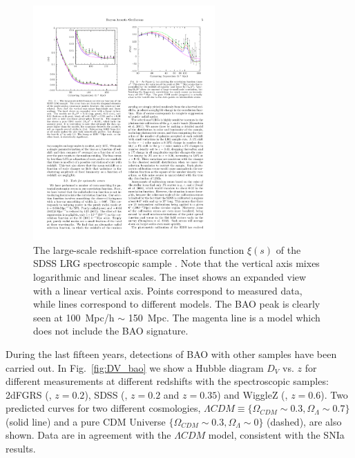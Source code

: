 \begin{figure}
\centering
\includegraphics[height=90mm]{./plots/bao_eisenstein.pdf} 
\caption{The large-scale redshift-space correlation function $\xi(s)$ of the SDSS LRG spectroscopic sample \citep{Eisenstein2005}. Note that the vertical axis mixes logarithmic and linear scales. The inset shows an expanded view with a linear vertical axis. Points correspond to measured data, while lines correspond to different models. The BAO peak is clearly seen at 100~Mpc/h $\sim$ 150~Mpc. The magenta line is a model which does not include the BAO signature.}
\label{fig:xi_bao}
\end{figure}
During the last fifteen years, detections of BAO with other samples have been carried out. In Fig.~\ref{fig:DV_bao} we show a Hubble diagram $D_V$ vs. $z$ for different measurements at different redshifts with the spectroscopic samples: 2dFGRS (\citet{Colless2001}, $z=0.2$), SDSS (\citet{York2000}, $z=0.2$ and $z=0.35$) and WiggleZ (\citet{Drinkwater2010}, $z=0.6$). Two predicted curves for two different cosmologies, $\Lambda CDM\equiv\lbrace \Omega_{CDM} \sim 0.3, \Omega_\Lambda \sim 0.7 \rbrace$ (solid line) and a pure CDM Universe $\lbrace \Omega_{CDM}\sim 0.3, \Omega_\Lambda \sim 0 \rbrace$ (dashed), are also shown. Data are in agreement with the $\Lambda CDM$ model, consistent with the SNIa results.

